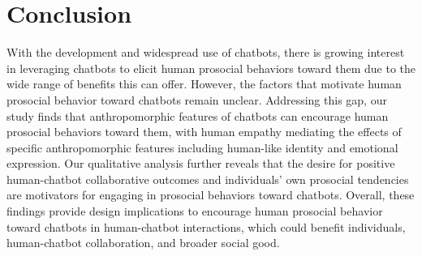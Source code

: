 \section{Conclusion}
With the development and widespread use of chatbots, there is growing interest in leveraging chatbots to elicit human prosocial behaviors toward them due to the wide range of benefits this can offer. However, the factors that motivate human prosocial behavior toward chatbots remain unclear. Addressing this gap, our study finds that anthropomorphic features of chatbots can encourage human prosocial behaviors toward them, with human empathy mediating the effects of specific anthropomorphic features including human-like identity and emotional expression. Our qualitative analysis further reveals that the desire for positive human-chatbot collaborative outcomes and individuals’ own prosocial tendencies are motivators for engaging in prosocial behaviors toward chatbots. Overall, these findings provide design implications to encourage human prosocial behavior toward chatbots in human-chatbot interactions, which could benefit individuals, human-chatbot collaboration, and broader social good.

